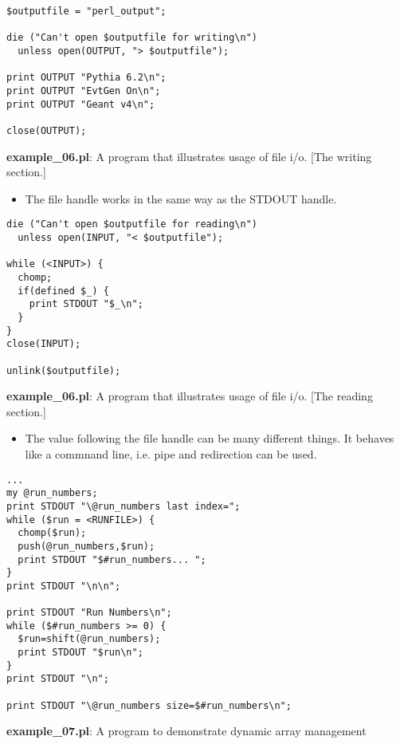 \documentclass[17pt,dvips]{foils}
\begin{document}


\begin{verbatim}
$outputfile = "perl_output";

die ("Can't open $outputfile for writing\n")
  unless open(OUTPUT, "> $outputfile");

print OUTPUT "Pythia 6.2\n";
print OUTPUT "EvtGen On\n";
print OUTPUT "Geant v4\n";
   
close(OUTPUT);
\end{verbatim}
{\bf example\_06.pl}: A program that illustrates usage of file i/o. [The
writing section.]

\begin{itemize}
\item The file handle works in the same way as the STDOUT handle.
\end{itemize}



\begin{verbatim}
die ("Can't open $outputfile for reading\n")
  unless open(INPUT, "< $outputfile");

while (<INPUT>) {
  chomp;
  if(defined $_) {
    print STDOUT "$_\n";
  }
}
close(INPUT);

unlink($outputfile);
\end{verbatim}
{\bf example\_06.pl}: A program that illustrates usage of file i/o. [The
reading section.]


\begin{itemize}
\item The value following the file handle can be many different
things. It behaves like a commnand line, i.e. pipe and redirection can
be used.
\end{itemize}


\begin{verbatim}
... 
my @run_numbers;
print STDOUT "\@run_numbers last index=";
while ($run = <RUNFILE>) {
  chomp($run);
  push(@run_numbers,$run);
  print STDOUT "$#run_numbers... ";
}
print STDOUT "\n\n";
 
print STDOUT "Run Numbers\n";
while ($#run_numbers >= 0) {
  $run=shift(@run_numbers);
  print STDOUT "$run\n";
}
print STDOUT "\n";
                                                                               print STDOUT "\@run_numbers size=$#run_numbers\n";
\end{verbatim}
{\bf example\_07.pl}: A program to demonstrate dynamic array management
\end{document}

